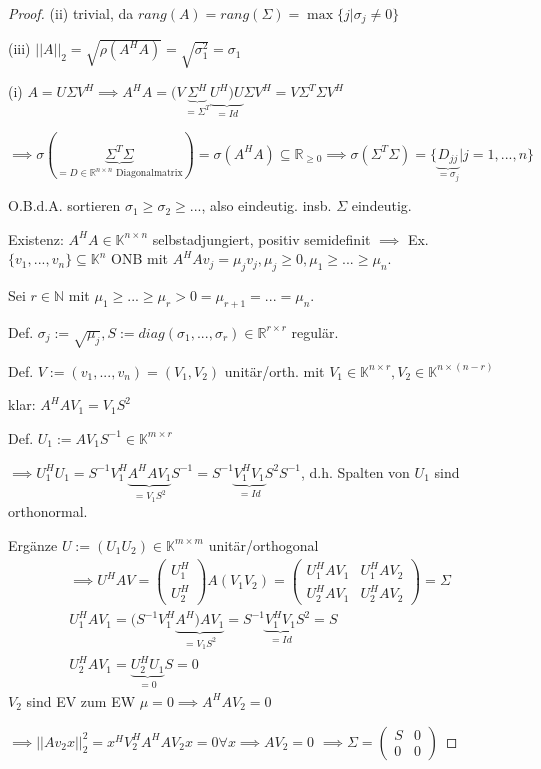\begin{proof}
	(ii) trivial, da $rang(A) = rang(\Sigma) = \max\{j | \sigma_j \neq 0\}$
	
	(iii) $||A||_2 = \sqrt{\rho(A^HA)} = \sqrt{\sigma_1^2} = \sigma_1$
	
	(i) $A = U\Sigma V^H \implies A^HA = (V\underbrace{\Sigma^H}_{=\Sigma^T} \underbrace{U^H)U}_{=Id}\Sigma V^H = V \Sigma^T\Sigma V^H$
	
	$\implies \sigma(\underbrace{\Sigma^T\Sigma}_{=D \in \mathbb{R}^{n\times n}\text{ Diagonalmatrix}}) = \sigma(A^HA) \subseteq \mathbb{R}_{\geq 0} \implies \sigma(\Sigma^T\Sigma) = \{\underbrace{D_{jj}}_{=\sigma_j}| j=1,...,n\}$
	
	O.B.d.A. sortieren $\sigma_1 \geq \sigma_2 \geq ...$, also eindeutig. insb. $\Sigma$ eindeutig.
	
	Existenz: $A^HA \in \mathbb{K}^{n\times n}$ selbstadjungiert, positiv semidefinit $\implies$ Ex. $\{v_1, ..., v_n\} \subseteq \mathbb{K}^n$ ONB mit $A^HAv_j = \mu_jv_j, \mu_j \geq 0, \mu_1 \geq ... \geq \mu_n$.
	
	Sei $r \in \mathbb{N}$ mit $\mu_1 \geq ... \geq \mu_r > 0 = \mu_{r+1} = ... = \mu_n$.
	
	Def. $\sigma_j := \sqrt{\mu_j}, S := diag(\sigma_1, ..., \sigma_r) \in \mathbb{R}^{r\times r}$ regulär.
	
	Def. $V :=(v_1, ..., v_n) = (V_1, V_2)$ unitär/orth. mit $V_1 \in \mathbb{K}^{n\times r}, V_2 \in \mathbb{K}^{n\times(n-r)}$
	
	klar: $A^HAV_1 = V_1S^2$
	
	Def. $U_1 := AV_1S^{-1} \in \mathbb{K}^{m\times r}$
	
	$\implies U_1^HU_1 = S^{-1}V_1^H\underbrace{A^HAV_1}_{=V_1S^2}S^{-1} = S^{-1}\underbrace{V_1^HV_1}_{=Id}S^2S^{-1}$, d.h. Spalten von $U_1$ sind orthonormal.
	
	Ergänze $U:=(U_1 U_2) \in \mathbb{K}^{m\times m}$ unitär/orthogonal
	\begin{align*}
		\implies U^HAV = \left(\begin{matrix}
			U_1^H\\
			U_2^H
		\end{matrix}\right)A (V_1 V_2) = \left(\begin{matrix}
			U_1^HAV_1 & U_1^HAV_2\\
			U_2^HAV_1 & U_2^HAV_2
		\end{matrix}\right) = \Sigma\\
		U_1^HAV_1 = (S^{-1}V_1^H\underbrace{A^H)AV_1}_{=V_1S^2} = S^{-1}\underbrace{V_1^HV_1}_{=Id}S^2 = S\\
		U_2^HAV_1 = \underbrace{U_2^HU_1}_{=0}S = 0
	\end{align*}
	$V_2$ sind EV zum EW $\mu = 0 \implies A^HAV_2 = 0$
	
	$\implies ||Av_2x||_2^2 = x^HV_2^HA^HAV_2x = 0 \forall x \implies AV_2 = 0$
	$\implies \Sigma = \left(\begin{matrix}
		S & 0\\
		0 & 0
	\end{matrix}\right)$
\end{proof}

